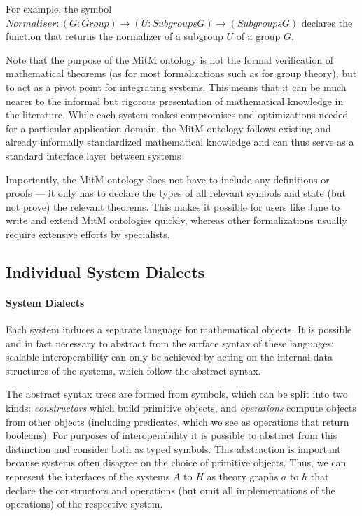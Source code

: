 For example, the symbol
$Normaliser : (G : Group) \to (U : Subgroups G) \to (Subgroups G)$ declares the
function that returns the normalizer of a subgroup $U$ of a group $G$.

Note that the purpose of the MitM ontology is not the formal verification of
mathematical theorems (as for most formalizations such as
\cite{Gonthier+:mcpoot13} for group theory), but to act as a pivot point for
integrating systems. This means that it can be much nearer to the informal but
rigorous presentation of mathematical knowledge in the literature. While each
system makes compromises and optimizations needed for a particular application
domain, the MitM ontology follows existing and already informally standardized
mathematical knowledge and can thus serve as a standard interface layer between
systems

Importantly, the MitM ontology does not have to include any definitions or
proofs --- it only has to declare the types of all relevant symbols and state
(but not prove) the relevant theorems. This makes it possible for users like
Jane to write and extend MitM ontologies quickly, whereas other formalizations
usually require extensive efforts by specialists.

\subsection{Individual System Dialects}\label{sec:mitm:dialect}

\paragraph{System Dialects}
Each system induces a separate language for mathematical objects. It is possible
and in fact necessary to abstract from the surface syntax of these languages:
scalable interoperability can only be achieved by acting on the internal data
structures of the systems, which follow the abstract syntax.

The abstract syntax trees are formed from symbols, which can be split into two
kinds: \emph{constructors} which build primitive objects, and \emph{operations}
compute objects from other objects (including predicates, which we see as
operations that return booleans). For purposes of interoperability it is
possible to abstract from this distinction and consider both as typed symbols.
This abstraction is important because systems often disagree on the choice of
primitive objects. Thus, we can represent the interfaces of the systems $A$ to
$H$ as \OMMT theory graphs $a$ to $h$ that declare the constructors and
operations (but omit all implementations of the operations) of the respective
system.

